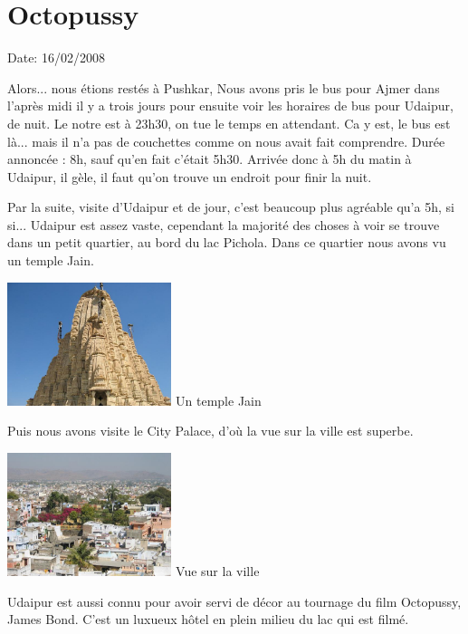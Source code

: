 \section{Octopussy}

Date: 16/02/2008

\begin{multicols}{2}

Alors... nous étions restés à Pushkar, Nous avons pris le bus pour Ajmer dans l'après midi il y a trois jours pour ensuite voir les horaires de bus pour Udaipur, de nuit. Le notre est à 23h30, on tue le temps en attendant. Ca y est, le bus est là... mais il n'a pas de couchettes comme on nous avait fait comprendre. Durée annoncée : 8h, sauf qu'en fait c'était 5h30. Arrivée donc à 5h du matin à Udaipur, il gèle, il faut qu'on trouve un endroit pour finir la nuit.

Par la suite, visite d'Udaipur et de jour, c'est beaucoup plus agréable qu'a 5h, si si... Udaipur est assez vaste, cependant la majorité des choses à voir se trouve dans un petit quartier, au bord du lac Pichola. Dans ce quartier nous avons vu un temple Jain.

\hspace*{-0.65cm}
\includegraphics[width=4.8cm]{articles/Octopussy/jain.jpg}
Un temple Jain

Puis nous avons visite le City Palace, d'où la vue sur la ville est superbe.

\hspace*{-0.65cm}
\includegraphics[width=4.8cm]{articles/Octopussy/zoomville.jpg}
Vue sur la ville

Udaipur est aussi connu pour avoir servi de décor au tournage du film Octopussy, James Bond. C'est un luxueux hôtel en plein milieu du lac qui est filmé.


\end{multicols}
